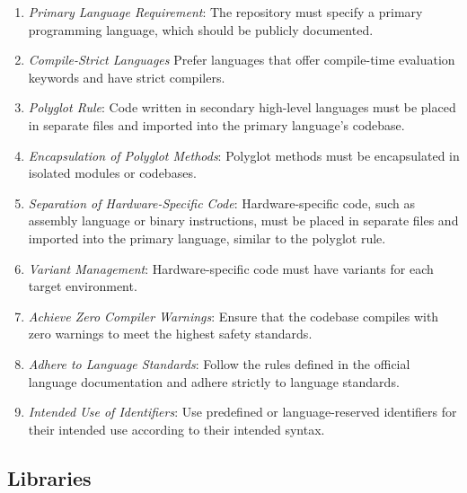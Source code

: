 \documentclass[9pt]{IEEEtran} %
\begin{document}
\begin{enumerate}
  \item \textit{Primary Language Requirement}: The repository must specify a primary programming language, which should be publicly documented.
  \item \textit{Compile-Strict Languages} Prefer languages that offer compile-time evaluation keywords and have strict compilers.
  \item \textit{Polyglot Rule}: Code written in secondary high-level languages must be placed in separate files and imported into the primary language's codebase.
  \item \textit{Encapsulation of Polyglot Methods}: Polyglot methods must be encapsulated in isolated modules or codebases.
  \item \textit{Separation of Hardware-Specific Code}: Hardware-specific code, such as assembly language or binary instructions, must be placed in separate files and imported into the primary language, similar to the polyglot rule.
  \item \textit{Variant Management}: Hardware-specific code must have variants for each target environment. 
  \item \textit{Achieve Zero Compiler Warnings}: Ensure that the codebase compiles with zero warnings to meet the highest safety standards.
  \item \textit{Adhere to Language Standards}: Follow the rules defined in the official language documentation and adhere strictly to language standards. 
  \item \textit{Intended Use of Identifiers}: Use predefined or language-reserved identifiers for their intended use according to their intended syntax.
\end{enumerate}

\subsection{Libraries}
\label{ESSLibraries}
\end{document}
